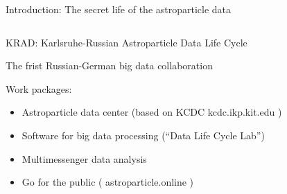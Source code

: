\documentclass[18pt]{beamer}
\begin{document}
\begin{frame}{Introduction: The secret life of the astroparticle data}
\begin{columns}
\begin{column}[t]{0.53\textwidth}
  \end{column}
\end{columns}
\end{frame}

\begin{frame}{\textcolor{kit-green100}{KRAD}: \textcolor{kit-green100}{K}arlsruhe-\textcolor{kit-green100}{R}ussian \textcolor{kit-green100}{A}stroparticle \textcolor{kit-green100}{D}ata Life Cycle}
\vspace{-1em     }
    \begin{figure}[h]
    \label{ris:image}
    \end{figure}
The frist Russian-German big data collaboration

\end{frame}

\begin{frame}
Work packages:
\begin{itemize}
 \item Astroparticle data center (based on KCDC kcdc.ikp.kit.edu )
 \item Software for big data processing (“Data Life Cycle Lab”)
 \item Multimessenger data analysis
 \item Go for the public ( astroparticle.online )
\end{itemize}
\end{frame}
\end{document}
